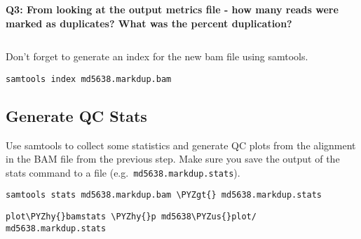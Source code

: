 \documentclass[11pt]{article}
\makeatletter
\def\PYZus{\char`\_}
\def\PYZgt{\char`\>}
\def\PYZhy{\char`\-}
\newcommand{\boxspacing}{\kern\kvtcb@left@rule\kern\kvtcb@boxsep}
\newcommand{\prompt}[4]{
        \ttfamily\llap{{\color{#2}[#3]:\hspace{3pt}#4}}\vspace{-\baselineskip}
    }
\makeatother
\begin{document}
    \textbf{Q3: From looking at the output metrics file - how many reads
were marked as duplicates? What was the percent duplication?}

    \begin{tcolorbox}[breakable, size=fbox, boxrule=1pt, pad at break*=1mm,colback=cellbackground, colframe=cellborder]
\prompt{In}{incolor}{ }{\boxspacing}
\begin{Verbatim}[commandchars=\\\{\}]

\end{Verbatim}
\end{tcolorbox}

    Don't forget to generate an index for the new bam file using samtools.

    \begin{tcolorbox}[breakable, size=fbox, boxrule=1pt, pad at break*=1mm,colback=cellbackground, colframe=cellborder]
\prompt{In}{incolor}{ }{\boxspacing}
\begin{Verbatim}[commandchars=\\\{\}]
samtools index md5638.markdup.bam
\end{Verbatim}
\end{tcolorbox}

    \hypertarget{generate-qc-stats}{%
\subsection{Generate QC Stats}\label{generate-qc-stats}}

Use samtools to collect some statistics and generate QC plots from the
alignment in the BAM file from the previous step. Make sure you save the
output of the stats command to a file
(e.g.~\texttt{md5638.markdup.stats}).

    \begin{tcolorbox}[breakable, size=fbox, boxrule=1pt, pad at break*=1mm,colback=cellbackground, colframe=cellborder]
\prompt{In}{incolor}{ }{\boxspacing}
\begin{Verbatim}[commandchars=\\\{\}]
samtools stats md5638.markdup.bam \PYZgt{} md5638.markdup.stats
\end{Verbatim}
\end{tcolorbox}

    \begin{tcolorbox}[breakable, size=fbox, boxrule=1pt, pad at break*=1mm,colback=cellbackground, colframe=cellborder]
\prompt{In}{incolor}{ }{\boxspacing}
\begin{Verbatim}[commandchars=\\\{\}]
plot\PYZhy{}bamstats \PYZhy{}p md5638\PYZus{}plot/ md5638.markdup.stats
\end{Verbatim}
\end{tcolorbox}
\end{document}

